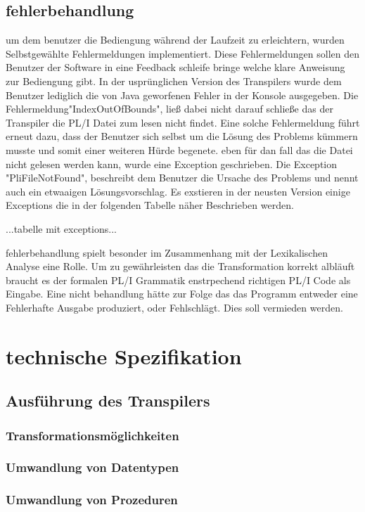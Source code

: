 \subsection{fehlerbehandlung}
um dem benutzer die Bediengung während der Laufzeit zu erleichtern, wurden Selbstgewählte Fehlermeldungen implementiert. Diese Fehlermeldungen sollen den Benutzer der Software in eine Feedback schleife bringe welche klare Anweisung zur Bediengung gibt. In der usprünglichen Version des Transpilers wurde dem Benutzer lediglich die von Java geworfenen Fehler in der Konsole ausgegeben. Die Fehlermeldung"IndexOutOfBounds", ließ dabei nicht darauf schließe das der Transpiler die PL/I Datei zum lesen nicht findet. Eine solche Fehlermeldung führt erneut dazu, dass der Benutzer sich selbst um die Lösung des Problems kümmern musste und somit einer weiteren Hürde begenete.
eben für dan fall das die Datei nicht gelesen werden kann, wurde eine Exception geschrieben. Die Exception "PliFileNotFound", beschreibt dem Benutzer die Ursache des Problems und nennt auch ein etwaaigen Lösungsvorschlag. Es exstieren in der neusten Version einige Exceptions die in der folgenden Tabelle näher Beschrieben werden.

...tabelle mit exceptions...

fehlerbehandlung spielt besonder im Zusammenhang mit der Lexikalischen Analyse eine Rolle. Um zu gewährleisten das die Transformation korrekt albläuft braucht es der formalen PL/I Grammatik enstrpechend richtigen PL/I Code als Eingabe. Eine nicht behandlung hätte zur Folge das das Programm entweder eine Fehlerhafte Ausgabe produziert, oder Fehlschlägt. Dies soll vermieden werden.

\section{technische Spezifikation}
	\subsection{Ausführung des Transpilers}
		\subsubsection{Transformationsmöglichkeiten}
		\subsubsection{Umwandlung von Datentypen}
		\subsubsection{Umwandlung von Prozeduren}
